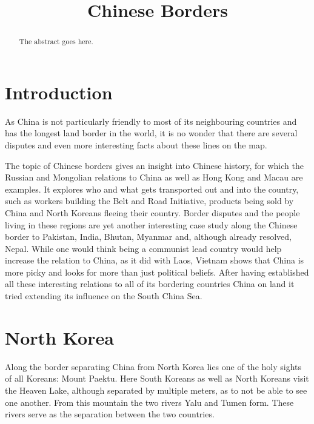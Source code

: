 \documentclass[conference]{IEEEtran}
\begin{document}
	
	\title{Chinese Borders}
	
	\author{
	}
	
	\maketitle
	
	\begin{abstract}
		The abstract goes here.
	\end{abstract}
	
	\section{Introduction}
	As China is not particularly friendly to most of its neighbouring countries and has the longest land border in the world, it is no wonder that there are several disputes and even more interesting facts about these lines on the map.
	
	The topic of Chinese borders gives an insight into Chinese history, for which the Russian and Mongolian relations to China as well as Hong Kong and Macau are examples. It explores who and what gets transported out and into the country, such as workers building the Belt and Road Initiative, products being sold by China and North Koreans fleeing their country. Border disputes and the people living in these regions are yet another interesting case study along the Chinese border to Pakistan, India, Bhutan, Myanmar and, although already resolved, Nepal. While one would think being a communist lead country would help increase the relation to China, as it did with Laos, Vietnam shows that China is more picky and looks for more than just political beliefs. After having established all these interesting relations to all of its bordering countries China on land it tried extending its influence on the South China Sea. 
	
	\section{North Korea}
	
	Along the border separating China from North Korea lies one of the holy sights of all Koreans: Mount Paektu. \cite{theIndianExpress_explainedWhatIsTheSignificanceOfMtPeaktuForKinJongUn} Here South Koreans as well as North Koreans visit the Heaven Lake, although separated by multiple meters, as to not be able to see one another. From this mountain the two rivers Yalu and Tumen form. These rivers serve as the separation between the two countries.
	
\end{document}

